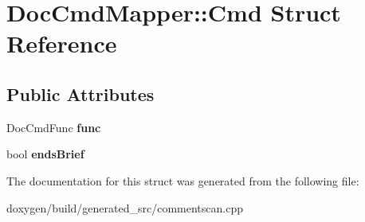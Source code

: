 \hypertarget{struct_doc_cmd_mapper_1_1_cmd}{}\section{Doc\+Cmd\+Mapper\+::Cmd Struct Reference}
\label{struct_doc_cmd_mapper_1_1_cmd}
\subsection*{Public Attributes}
\begin{DoxyCompactItemize}
\item 
\mbox{\label{struct_doc_cmd_mapper_1_1_cmd_afe8587817046b6c1074c9350037cfb06}} 
Doc\+Cmd\+Func {\bfseries func}
\item 
\mbox{\label{struct_doc_cmd_mapper_1_1_cmd_ad4275b59b317c26cc5798805291f77be}} 
bool {\bfseries ends\+Brief}
\end{DoxyCompactItemize}


The documentation for this struct was generated from the following file\+:\begin{DoxyCompactItemize}
\item 
doxygen/build/generated\+\_\+src/commentscan.\+cpp\end{DoxyCompactItemize}
